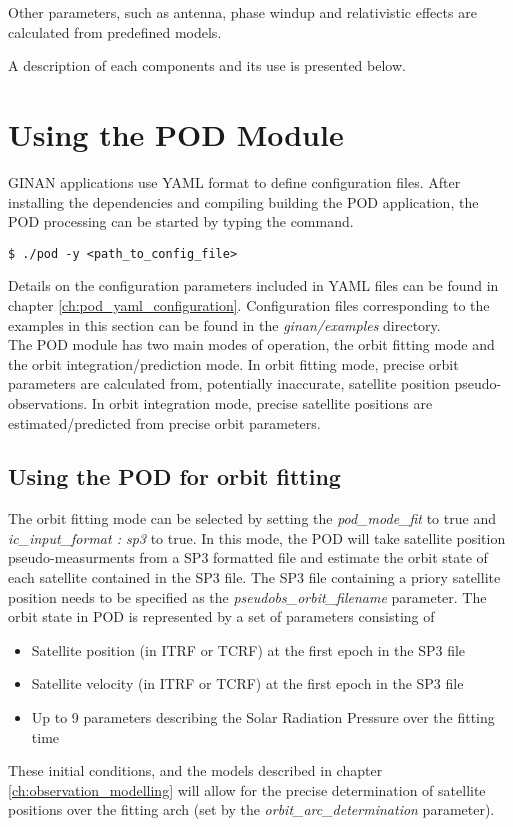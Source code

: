 Other parameters, such as antenna, phase windup and relativistic effects are calculated from predefined models.

A description of each components and its use is presented below.\\

\chapter{Using the POD Module}
GINAN applications use YAML format to define configuration files. After installing the dependencies and compiling building the POD application, the POD processing can be started by typing the command.
\begin{lstlisting}
$ ./pod -y <path_to_config_file>
\end{lstlisting}
Details on the configuration parameters included in YAML files can be found in chapter \ref{ch:pod_yaml_configuration}. Configuration files corresponding to the examples in this section can be found in the \textit{ginan/examples} directory.\\

The POD module has two main modes of operation, the orbit fitting mode and the orbit integration/prediction mode. In orbit fitting mode, precise orbit parameters are calculated from, potentially inaccurate, satellite position pseudo-observations. In orbit integration mode, precise satellite positions are estimated/predicted from precise orbit parameters.\\

\section{Using the POD for orbit fitting}
The orbit fitting mode can be selected by setting the \textit{ pod\_mode\_fit} to true and \textit{ic\_input\_format : sp3} to true. In this mode, the POD will take satellite position pseudo-measurments from a SP3 formatted file and estimate the orbit state of each satellite contained in the SP3 file. The SP3 file containing a priory satellite position needs to be specified as the \textit{pseudobs\_orbit\_filename} parameter.
The orbit state in POD is represented by a set of parameters consisting of 
\begin{itemize}
	\item Satellite position (in ITRF or TCRF) at the first epoch in the SP3 file
	\item Satellite velocity (in ITRF or TCRF) at the first epoch in the SP3 file
	\item Up to 9 parameters describing the Solar Radiation Pressure over the fitting time
\end{itemize}
These initial conditions, and the models described in chapter \ref{ch:observation_modelling} will allow for the precise determination of satellite positions over the fitting arch (set by the \textit{orbit\_arc\_determination} parameter).\\

